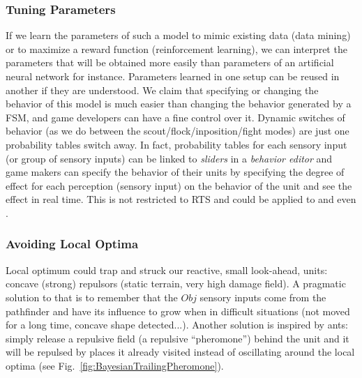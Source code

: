 \subsubsection{Tuning Parameters}
If we learn the parameters of such a model to mimic existing data (data mining) or to maximize a reward function (reinforcement learning), we can interpret the parameters that will be obtained more easily than parameters of an artificial neural network for instance. Parameters learned in one setup can be reused in another if they are understood. We claim that specifying or changing the behavior of this model is much easier than changing the behavior generated by a FSM, and game developers can have a fine control over it. Dynamic switches of behavior (as we do between the scout/flock/inposition/fight modes) are just one probability tables switch away. In fact, probability tables for each sensory input (or group of sensory inputs) can be linked to \textit{sliders} in a \textit{behavior editor} and game makers can specify the behavior of their units by specifying the degree of effect for each perception (sensory input) on the behavior of the unit and see the effect in real time. This is not restricted to RTS and could be applied to  and even  .

\subsubsection{Avoiding Local Optima}
Local optimum could trap and struck our reactive, small look-ahead, units: concave (strong) repulsors (static terrain, very high damage field). A pragmatic solution to that is to remember that the $Obj$ sensory inputs come from the pathfinder and have its influence to grow when in difficult situations (not moved for a long time, concave shape detected...). Another solution is inspired by ants: simply release a repulsive field (a repulsive ``pheromone'') behind the unit and it will be repulsed by places it already visited instead of oscillating around the local optima (see Fig.~\ref{fig:BayesianTrailingPheromone}).


